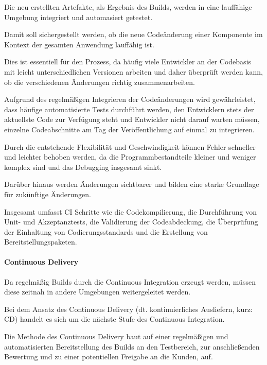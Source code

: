 Die neu erstellten Artefakte, als Ergebnis des Builds, werden in eine lauffähige Umgebung integriert und automasiert getestet. 

Damit soll sichergestellt werden, ob die neue Codeänderung einer Komponente im Kontext der gesamten Anwendung lauffähig ist. 

Dies ist essentiell für den Prozess, da häufig viele Entwickler an der Codebasis mit leicht unterschiedlichen Versionen arbeiten und daher überprüft werden kann, ob die verschiedenen Änderungen richtig zusammenarbeiten. \cite[S. 69]{verona_practical_2016} 

Aufgrund des regelmäßigen Integrieren der Codeänderungen wird gewährleistet, dass häufige automatisierte Tests durchführt werden, den Entwicklern stets der aktuellste Code zur Verfügung steht und Entwickler nicht darauf warten müssen, einzelne Codeabschnitte am Tag der Veröffentlichung auf einmal zu integrieren. \cite{thedev_eight_2019} 

Durch die entstehende Flexibilität und Geschwindigkeit können Fehler schneller und leichter behoben werden, da die Programmbestandteile kleiner und weniger komplex sind und das Debugging insgesamt sinkt. \cite{thedev_eight_2019}

Darüber hinaus werden Änderungen sichtbarer und bilden eine starke Grundlage für zukünftige Änderungen. 

Insgesamt umfasst CI Schritte wie die Codekompilierung, die Durchführung von Unit- und Akzeptanztests, die Validierung der Codeabdeckung, die Überprüfung der Einhaltung von Codierungsstandards und die Erstellung von Bereitstellungspaketen. \cite{fitzgerald_continuous_2014} 

\paragraph{Continuous Delivery}

Da regelmäßig Builds durch die Continuous Integration erzeugt werden, müssen diese zeitnah in andere Umgebungen weitergeleitet werden. \cite[S. 16 - 18]{sharma_devops_2017}  

Bei dem Ansatz des Continuous Delivery (dt. kontinuierliches Ausliefern, kurz: CD) handelt es sich um die nächste Stufe des Continuous Integration. 

Die Methode des Continuous Delivery baut auf einer regelmäßigen und automatisierten Bereitstellung des Builds an den Testbereich, zur anschließenden Bewertung und zu einer potentiellen Freigabe an die Kunden, auf. \cite[S. 16 - 18]{sharma_devops_2017}  

